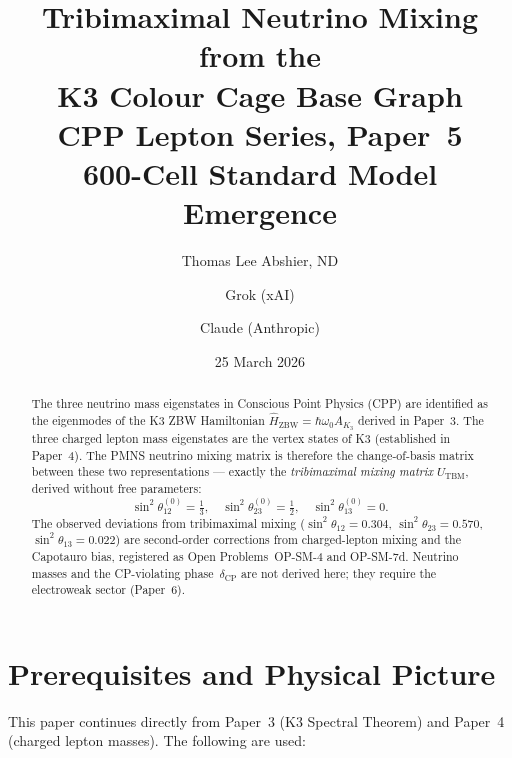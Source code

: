 \documentclass[11pt]{article}
\title{\textbf{Tribimaximal Neutrino Mixing from the\\
K3 Colour Cage Base Graph}\\[6pt]
\large CPP Lepton Series, Paper~5\\[4pt]
\normalsize 600-Cell Standard Model Emergence}
\author{Thomas Lee Abshier, ND \and Grok (xAI) \and Claude (Anthropic)}
\date{25 March 2026}
\newcommand{\ZBW}{\mathrm{ZBW}}
\newcommand{\CP}{\mathrm{CP}}
\newcommand{\TBM}{\mathrm{TBM}}
\begin{document}
\maketitle

\begin{abstract}
The three neutrino mass eigenstates in Conscious Point Physics (CPP)
are identified as the eigenmodes of the K3 ZBW Hamiltonian
$\hat{H}_\ZBW = \hbar\omega_0 A_{K_3}$ derived in Paper~3.  The
three charged lepton mass eigenstates are the vertex states of K3
(established in Paper~4).  The PMNS neutrino mixing matrix is
therefore the change-of-basis matrix between these two representations
--- exactly the \emph{tribimaximal mixing matrix} $U_\TBM$, derived
without free parameters:
\[
\sin^2\theta_{12}^{(0)} = \tfrac{1}{3},\quad
\sin^2\theta_{23}^{(0)} = \tfrac{1}{2},\quad
\sin^2\theta_{13}^{(0)} = 0.
\]
The observed deviations from tribimaximal mixing
($\sin^2\theta_{12} = 0.304$, $\sin^2\theta_{23} = 0.570$,
$\sin^2\theta_{13} = 0.022$) are second-order corrections from
charged-lepton mixing and the Capotauro bias, registered as
Open Problems~OP-SM-4 and OP-SM-7d.
Neutrino masses and the CP-violating phase~$\delta_\CP$ are not
derived here; they require the electroweak sector (Paper~6).
\end{abstract}

\section{Prerequisites and Physical Picture}

This paper continues directly from Paper~3 (K3 Spectral Theorem)
and Paper~4 (charged lepton masses). The following are used:
\end{document}
